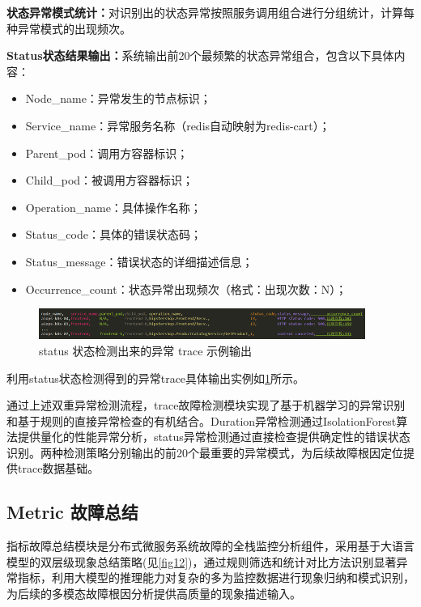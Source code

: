 \documentclass[11pt]{article}
\begin{document}
\textbf{状态异常模式统计：}对识别出的状态异常按照服务调用组合进行分组统计，计算每种异常模式的出现频次。

\textbf{Status状态结果输出：}系统输出前20个最频繁的状态异常组合，包含以下具体内容：

\begin{itemize}
    \item Node\_name：异常发生的节点标识；
    \item Service\_name：异常服务名称（redis自动映射为redis-cart）；
    \item Parent\_pod：调用方容器标识；
    \item Child\_pod：被调用方容器标识；
    \item Operation\_name：具体操作名称；
    \item Status\_code：具体的错误状态码；
    \item Status\_message：错误状态的详细描述信息；
    \item Occurrence\_count：状态异常出现频次（格式：出现次数：N）；
\end{itemize}

\begin{figure}[htbp]
    \centering
    \includegraphics[width=0.95\textwidth]{pics/fig11.png}
    \caption{status 状态检测出来的异常 trace 示例输出}
    \label{fig11}
\end{figure}

利用status状态检测得到的异常trace具体输出实例如\ref{fig11}所示。

通过上述双重异常检测流程，trace故障检测模块实现了基于机器学习的异常识别和基于规则的直接异常检查的有机结合。Duration异常检测通过IsolationForest算法提供量化的性能异常分析，status异常检测通过直接检查提供确定性的错误状态识别。两种检测策略分别输出的前20个最重要的异常模式，为后续故障根因定位提供trace数据基础。

\subsection{Metric 故障总结}

指标故障总结模块是分布式微服务系统故障的全栈监控分析组件，采用基于大语言模型的双层级现象总结策略(见\ref{fig12})，通过规则筛选和统计对比方法识别显著异常指标，利用大模型的推理能力对复杂的多为监控数据进行现象归纳和模式识别，为后续的多模态故障根因分析提供高质量的现象描述输入。
\end{document}
